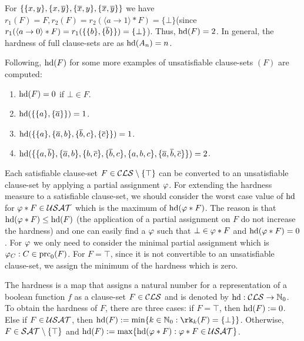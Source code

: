 \documentclass{report}
\begin{document}
\begin{examp}\label{exp:harducls}
For $\{ \{ x,y \},\{ x,\overline{y} \},\{ \overline{x},y \},\{ \overline{x},\overline{y} \} \}$ we have $r_1(F)=F, r_2(F)=r_2( \langle a \rightarrow 1 \rangle * F) = \{ \bot \}$(since $r_1( \langle a \rightarrow 0 \rangle * F)=r_1 (\{\{ b \}, \{ \overline b \}\}) = \{ \bot \}$). Thus, $\operatorname{hd}(F) = 2$. In general, the hardness of full clause-sets are as $\operatorname{hd}(A_n)=n$.
  
Following, $\operatorname{hd}(F)$ for some more examples of unsatisfiable clause-sets $(F)$ are computed:
  \begin{enumerate}
  \item $\operatorname{hd}(F) = 0$ if $\bot \in F$.
  \item $\operatorname{hd}(\{ \{ a \},\{ \overline{a} \} \}) = 1$.
  \item $\operatorname{hd}(\{ \{ a \},\{ \overline{a},b \}, \{ \overline{b},c \}, \{ \overline{c} \} \}) = 1$. 
  \item $\operatorname{hd}(\{ \{ a,\overline{b} \},\{ \overline{a},b \},\{ b,\overline{c} \},\{ \overline{b},c \},\{ a,b,c \},\{ \overline{a},\overline{b},\overline{c} \} \}) = 2$.
  \end{enumerate}
\end{examp}

Each satisfiable clause-set $F \in \mathcal{CLS} \setminus \{ \top \}$ can be converted to an unsatisfiable clause-set by applying a partial assignment $\varphi$. For extending the hardness measure to a satisfiable clause-set, we should consider the worst case value of $\operatorname{hd}$ for $\varphi * F \in \mathcal{USAT}$ which is the maximum of $\operatorname{hd}(\varphi * F)$. The reason is that $\operatorname{hd}(\varphi * F) \leq \operatorname{hd}(F)$ (the application of a partial assignment on $F$ do not increase the hardness) and one can easily find a $\varphi$ such that $\bot \in \varphi * F$ and $\operatorname{hd}(\varphi * F)=0$. For $\varphi$ we only need to consider the minimal partial assignment which is $\varphi_C : C \in \operatorname{prc}_0(F)$. For $F = \top$, since it is not convertible to an unsatisfiable clause-set, we assign the minimum of the hardness which is zero.

\begin{defi}\label{def:hd-extended}
The hardness is a map that assigns a natural number for a representation of a boolean function $f$ as a clause-set $F \in \mathcal{CLS}$ and is denoted by $\operatorname{hd} : \mathcal{CLS} \rightarrow \mathbb{N}_0$. To obtain the hardness of  $F$, there are three cases: if $F = \top$, then $\operatorname{hd}(F) := 0$. Else if $F \in \mathcal{USAT}$, then $\hardness(F) := \min \set{k \in \NNZ : \rk_k(F)=\set{\bot}}$. Otherwise, $F \in \mathcal{SAT} \setminus \{ \top \}$ and $\operatorname{hd}(F) := \max \{  \operatorname{hd}(\varphi * F) : \varphi * F \in \mathcal{USAT}  \}$.
\end{defi}
\end{document}
